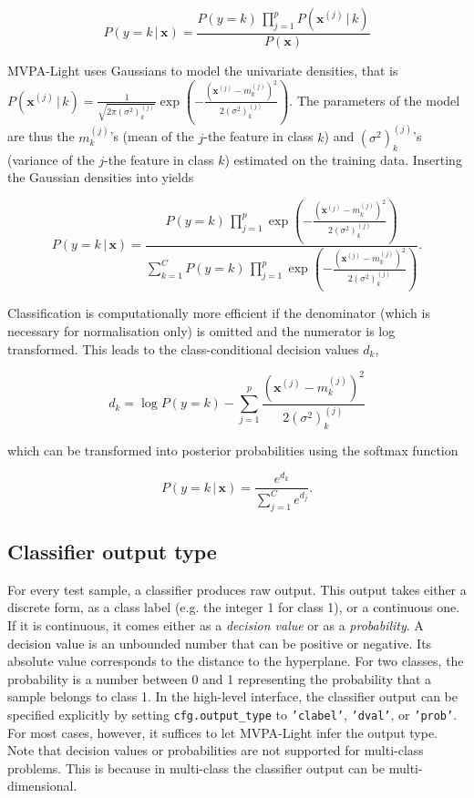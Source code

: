 \documentclass[utf8]{frontiersSCNS} %
\newcommand{\mf}[2]{m_#1^{(#2)}}
\newcommand{\sig}[2]{(\sigma^2)_#1^{(#2)}}
\newcommand{\x}{\mathbf{x}}
\newcommand{\xf}[1]{\mathbf{x}^{(#1)}} %
\newcommand{\ttt}[1]{\texttt{#1}}
\begin{document}
\begin{equation}
\label{eq:naive_bayes}
P(y = k\,|\,\x) = \frac{P(y = k)\,\prod_{j=1}^p P(\xf{j}\,|\,k)}{P(\x)}
\end{equation}

MVPA-Light uses Gaussians to model the univariate densities, that is $P(\xf{j}\,|\,k) = \frac{1}{\sqrt{2\pi\sig{k}{j}}} \exp(-\frac{(\xf{j} - \mf{k}{j})^2}{2\sig{k}{j}})$. The parameters of the model are thus the $\mf{k}{j}$'s (mean of the $j$-the feature in class $k$) and $\sig{k}{j}$'s (variance of the $j$-the feature in class $k$) estimated on the training data. Inserting the Gaussian densities into  yields

\begin{equation}
\label{eq:naive_bayes_gaussian}
P(y = k\,|\,\x) = \frac{P(y = k)\,\prod_{j=1}^p \exp(-\frac{(\xf{j} - \mf{k}{j})^2}{2\sig{k}{j}})}%
{\sum_{k=1}^C P(y = k)\,\prod_{j=1}^p \exp(-\frac{(\xf{j} - \mf{k}{j})^2}{2\sig{k}{j}})}.
\end{equation}

Classification is computationally more efficient if the denominator (which is necessary for normalisation only) is omitted and the numerator is log transformed. This leads to the class-conditional decision values $d_k$,

\begin{equation}
\label{eq:naive_bayes_dval}
d_k = \log P(y = k) - \sum_{j=1}^p \frac{(\xf{j} - \mf{k}{j})^2}{2\sig{k}{j}}
\end{equation}

which can be transformed into posterior probabilities using the softmax function 

\begin{equation}
\label{eq:naive_bayes_softmax}
P(y = k\,|\,\x) = \frac{e^{d_k}}{\sum_{j=1}^C e^{d_j}}.
\end{equation}

\subsection{Classifier output type}\label{sec:output}

For every test sample, a classifier produces raw output. This output takes either a discrete form, as a class label (e.g. the integer 1 for class 1), or a continuous one. If it is continuous, it comes either as a \textit{decision value} or as a \textit{probability}. A decision value is an unbounded number that can be positive or negative. Its absolute value corresponds to the distance to the hyperplane. For two classes, the probability is a number between 0 and 1 representing the probability that a sample belongs to class 1. 
In the high-level interface, the classifier output can be specified explicitly by setting \ttt{cfg.output\_type} to \ttt{'clabel'}, \ttt{'dval'}, or \ttt{'prob'}. For most cases, however, it suffices to let MVPA-Light infer the output type. Note that decision values or probabilities are not supported for multi-class problems. This is because in multi-class the classifier output can be multi-dimensional. 
\end{document}
